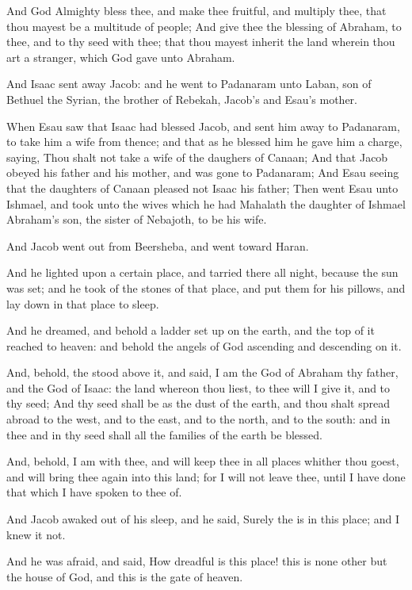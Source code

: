 \verse And God Almighty bless thee, and make thee fruitful, and multiply
thee, that thou mayest be a multitude of people; \verse And give thee
the blessing of Abraham, to thee, and to thy seed with thee; that thou
mayest inherit the land wherein thou art a stranger, which God gave
unto Abraham.

\verse And Isaac sent away Jacob: and he went to Padanaram unto Laban,
son of Bethuel the Syrian, the brother of Rebekah, Jacob's and Esau's
mother.

\verse When Esau saw that Isaac had blessed Jacob, and sent him away to
Padanaram, to take him a wife from thence; and that as he blessed him
he gave him a charge, saying, Thou shalt not take a wife of the
daughers of Canaan; \verse And that Jacob obeyed his father and his
mother, and was gone to Padanaram; \verse And Esau seeing that the
daughters of Canaan pleased not Isaac his father; \verse Then went Esau
unto Ishmael, and took unto the wives which he had Mahalath the
daughter of Ishmael Abraham's son, the sister of Nebajoth, to be his
wife.

\verse And Jacob went out from Beersheba, and went toward Haran.

\verse And he lighted upon a certain place, and tarried there all
night, because the sun was set; and he took of the stones of that
place, and put them for his pillows, and lay down in that place to
sleep.

\verse And he dreamed, and behold a ladder set up on the earth, and the
top of it reached to heaven: and behold the angels of God ascending
and descending on it.

\verse And, behold, the \LORD stood above it, and said, I am the \LORD
God of Abraham thy father, and the God of Isaac: the land whereon thou
liest, to thee will I give it, and to thy seed; \verse And thy seed
shall be as the dust of the earth, and thou shalt spread abroad to the
west, and to the east, and to the north, and to the south: and in thee
and in thy seed shall all the families of the earth be blessed.

\verse And, behold, I am with thee, and will keep thee in all places
whither thou goest, and will bring thee again into this land; for I
will not leave thee, until I have done that which I have spoken to
thee of.

\verse And Jacob awaked out of his sleep, and he said, Surely the \LORD
is in this place; and I knew it not.

\verse And he was afraid, and said, How dreadful is this place! this is
none other but the house of God, and this is the gate of heaven.

